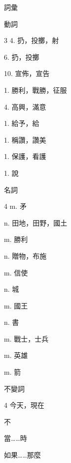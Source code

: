\documentclass[aspectratio=169]{beamer}
\begin{document}
\begin{frame}{詞彙}
    \footnotesize
    \begin{block}{動詞}
        \begin{VocabCols}{3}
             4.  扔，投擲，射
            
             6.  扔，投擲
            
             10.  宣佈，宣告
            
             1.  勝利，戰勝，征服
            
             4.  高興，滿意
            
             1.  給予，給
            
             1.  稱讚，讚美
            
             1.  保護，看護
            
             1.  說
        \end{VocabCols}
    \end{block}

    \begin{block}{名詞}
        \begin{VocabCols}{4}
             m. 矛
            
             n. 田地，田野，國土
            
             m. 勝利
            
             n. 贈物，布施
            
             m. 信使
            
             n. 城
            
             m. 國王
            
             n. 書
            
             m. 戰士，士兵
            
             m. 英雄
            
             m. 箭
        \end{VocabCols}
    \end{block}

    \begin{block}{不變詞}
        \begin{VocabCols}{4}
             今天，現在
            
             不
            
             當……時
            
             如果……那麼
        \end{VocabCols}
    \end{block}
\end{frame}
\end{document}
